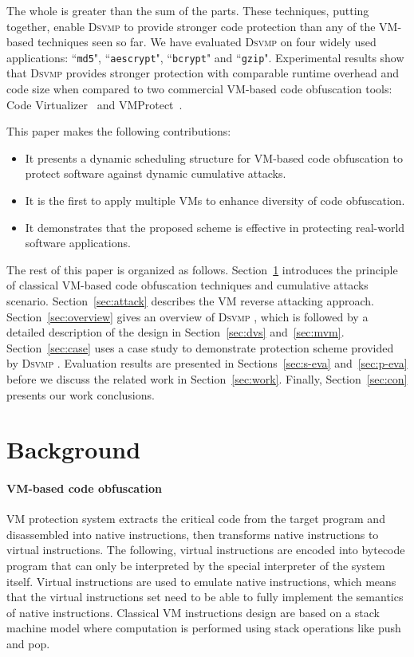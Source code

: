\documentclass[preprint,12pt,3p]{elsarticle}
\newcommand{\DSVMP}{\textsc{Dsvmp }}
\begin{document}
The whole is greater than the sum of the parts. These techniques, putting together,
enable \DSVMP to provide stronger code protection than any of the VM-based techniques seen so far.
We have evaluated \DSVMP on four widely used applications:  ``\texttt{md5}", ``\texttt{aescrypt}", ``\texttt{bcrypt}" and ``\texttt{gzip}". Experimental results show that \DSVMP provides stronger protection with comparable runtime overhead and code size
when compared to two commercial VM-based code obfuscation tools: Code Virtualizer~\cite{2CV} and VMProtect~\cite{3Vmprotect}.


This paper makes the following contributions:
\begin{itemize}
  \item It presents a dynamic scheduling structure for VM-based code obfuscation to protect software against dynamic cumulative attacks.
  \item It is the first to apply multiple VMs to enhance diversity of code obfuscation.
  \item It demonstrates that the proposed scheme is effective in protecting real-world software applications.
\end{itemize}

The rest of this paper is organized as follows.
Section~\ref{sec:bak} introduces the principle of classical VM-based
code obfuscation techniques and cumulative attacks scenario.
Section~\ref{sec:attack} describes the VM reverse attacking approach.
Section~\ref{sec:overview} gives an overview of \DSVMP,
which is followed by a detailed description of the design in Section~\ref{sec:dvs} and~\ref{sec:mvm}.
Section~\ref{sec:case} uses a case study to demonstrate protection scheme provided by \DSVMP.
Evaluation results are presented in Sections~\ref{sec:s-eva} and~\ref{sec:p-eva} before we discuss the related work
in Section~\ref{sec:work}. Finally, Section~\ref{sec:con} presents our work conclusions.


\section{Background}\label{sec:bak}

\paragraph*{VM-based code obfuscation}
VM protection system extracts the critical code from the target program and disassembled
into native instructions, then transforms native instructions to virtual instructions.
The following, virtual instructions are encoded into bytecode program that can only be interpreted by
the special interpreter of the system itself. Virtual instructions are used to emulate native instructions,
which means that the virtual instructions set need to be able to fully implement the semantics of native instructions.
Classical VM instructions design are based on a stack machine model
where computation is performed using stack operations like push and pop.
\end{document}
